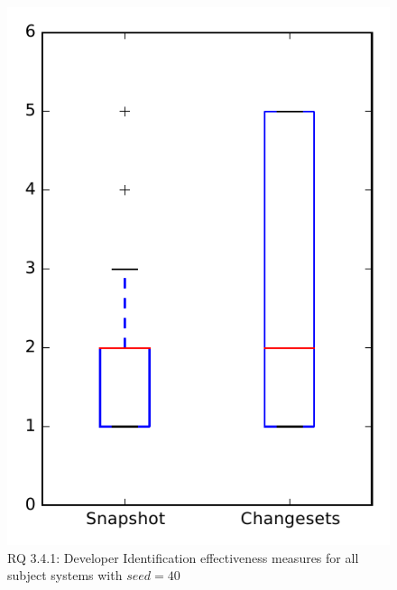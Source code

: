 
\begin{figure}
\centering
\includegraphics[height=0.4\textheight]{figures/dit_seed/rq1_overview_40}
\caption{RQ 3.4.1: Developer Identification effectiveness measures for all subject systems with $seed=40$}
\label{fig:dit_seed:rq1:overview}
\end{figure}
